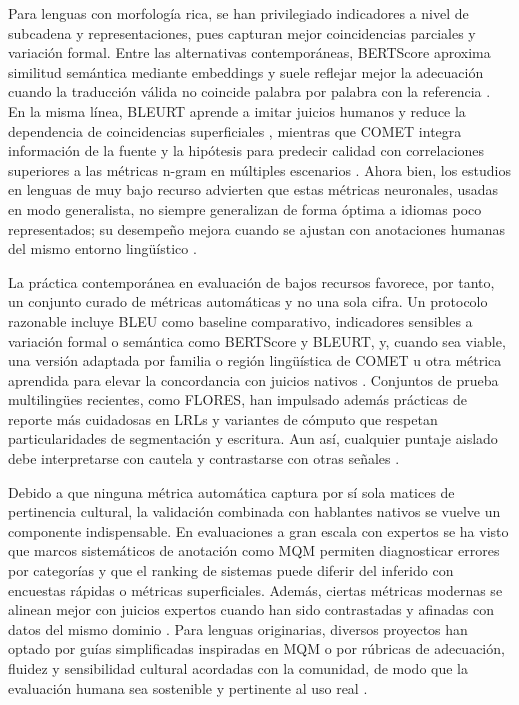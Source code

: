 \documentclass[12pt,a4paper,oneside]{book}
\begin{document}
Para lenguas con morfología rica, se han privilegiado indicadores a nivel de subcadena y representaciones, pues capturan mejor coincidencias parciales y variación formal. Entre las alternativas contemporáneas, BERTScore aproxima similitud semántica mediante embeddings y suele reflejar mejor la adecuación cuando la traducción válida no coincide palabra por palabra con la referencia \parencite{zhang2020bertscore}. En la misma línea, BLEURT aprende a imitar juicios humanos y reduce la dependencia de coincidencias superficiales \parencite{sellam2020bleurt}, mientras que COMET integra información de la fuente y la hipótesis para predecir calidad con correlaciones superiores a las métricas n-gram en múltiples escenarios \parencite{rei2020comet}. Ahora bien, los estudios en lenguas de muy bajo recurso advierten que estas métricas neuronales, usadas en modo generalista, no siempre generalizan de forma óptima a idiomas poco representados; su desempeño mejora cuando se ajustan con anotaciones humanas del mismo entorno lingüístico \parencite{sai2023indicmt,wang2024africomet}.

La práctica contemporánea en evaluación de bajos recursos favorece, por tanto, un conjunto curado de métricas automáticas y no una sola cifra. Un protocolo razonable incluye BLEU como baseline comparativo, indicadores sensibles a variación formal o semántica como BERTScore y BLEURT, y, cuando sea viable, una versión adaptada por familia o región lingüística de COMET u otra métrica aprendida para elevar la concordancia con juicios nativos \parencite{sai2023indicmt,wang2024africomet}. Conjuntos de prueba multilingües recientes, como FLORES, han impulsado además prácticas de reporte más cuidadosas en LRLs y variantes de cómputo que respetan particularidades de segmentación y escritura. Aun así, cualquier puntaje aislado debe interpretarse con cautela y contrastarse con otras señales \parencite{nllb2022,post2018}.

Debido a que ninguna métrica automática captura por sí sola matices de pertinencia cultural, la validación combinada con hablantes nativos se vuelve un componente indispensable. En evaluaciones a gran escala con expertos se ha visto que marcos sistemáticos de anotación como MQM permiten diagnosticar errores por categorías y que el ranking de sistemas puede diferir del inferido con encuestas rápidas o métricas superficiales. Además, ciertas métricas modernas se alinean mejor con juicios expertos cuando han sido contrastadas y afinadas con datos del mismo dominio \parencite{freitag2021}. Para lenguas originarias, diversos proyectos han optado por guías simplificadas inspiradas en MQM o por rúbricas de adecuación, fluidez y sensibilidad cultural acordadas con la comunidad, de modo que la evaluación humana sea sostenible y pertinente al uso real \parencite{sai2023indicmt,wang2024africomet}.
\end{document}
